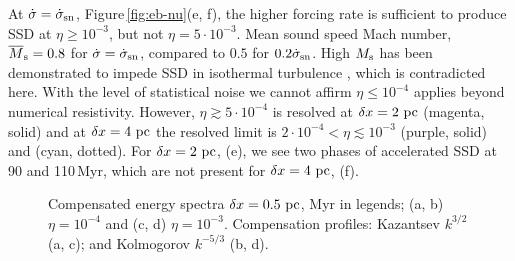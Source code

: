 \documentclass[preprint2]{aastex63}
\newcommand\SNr{\dot\sigma_{\rm sn}}
\newcommand\Ms{M_{\rm s}}
\newcommand\pc{~ {\rm pc}}
\newcommand\dx{ {\delta x}}
\begin{document}
 At $\dot\sigma=\SNr$, Figure\,\ref{fig:eb-nu}(e, f), the higher forcing rate is sufficient to produce SSD at $\eta\geq10^{-3}$, but not $\eta=5\cdot10^{-3}$.
 Mean sound speed Mach number, $\overline\Ms=0.8$ for $\dot\sigma=\SNr$,
 compared to $0.5$ for $0.2\SNr$.
 High $\Ms$ has been demonstrated to impede SSD in isothermal turbulence
 \citep{Haugen:2004M}, which is contradicted here.
 With the level of statistical noise we cannot affirm $\eta\leq10^{-4}$
 applies beyond numerical resistivity.
 However, $\eta\gtrsim5\cdot10^{-4}$ is
 resolved at $\dx=2\pc$ (magenta, solid) and 
 at $\dx=4\pc$ the resolved limit is $2\cdot10^{-4}<\eta\lesssim10^{-3}$
 (purple, solid) and (cyan, dotted).
 For $\dx=2\pc$, (e), we see two phases of accelerated SSD at 90 and
 110\,Myr, which are not present for $\dx=4\pc$, (f).

\begin{figure*}
\caption{
Compensated energy spectra $\dx=0.5\pc$, Myr in legends;
(a, b) $\eta=10^{-4}$ and  (c, d) $\eta=10^{-3}$.
Compensation profiles: Kazantsev
$k^{3/2}$ (a, c); and Kolmogorov $k^{-5/3}$ (b, d).
\label{fig:4power}}
\end{figure*}
\end{document}
